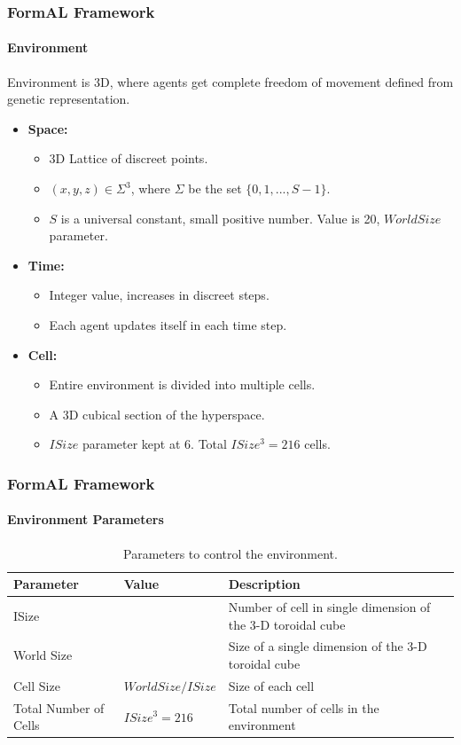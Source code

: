 \frame
{
	\frametitle{FormAL Framework}
	\framesubtitle{Environment}
	
	Environment is 3D, where agents get complete freedom of movement defined from genetic representation.
	\begin{itemize}
		\item \textbf{Space:}
			\begin{itemize}
				\item 3D Lattice of discreet points.
				\item \((x,y,z) \in \Sigma^3\), where \(\Sigma\) be the set \(\{0, 1, ..., S-1\}\).
				\item \(S\) is a universal constant, small positive number. Value is 20, \(World Size\) parameter. 
			\end{itemize}
		\item \textbf{Time:}
			\begin{itemize}
				\item Integer value, increases in discreet steps. 
				\item Each agent updates itself in each time step.
			\end{itemize}
		\item \textbf{Cell:}
			\begin{itemize}
				\item Entire environment is divided into multiple cells.
				\item A 3D cubical section of the hyperspace.
				\item \(ISize\) parameter kept at 6. Total \(ISize^3 = 216\) cells.
			\end{itemize}
	\end{itemize}
}

\frame
{
	\frametitle{FormAL Framework}
	\framesubtitle{Environment Parameters}
	
	\begin{table}[H]
	\centering
	\begin{spacing}{1.5}
	\begin{scriptsize}
	\begin{tabular}{| p{1.5cm} | >{\centering} p{2cm} | p{4cm} |}
		\hline
			\textbf{Parameter} & \textbf{Value} & \textbf{Description} \\ \hline
			ISize & 6 & Number of cell in single dimension of the 3-D toroidal cube\\ \hline
			World Size & 20 & Size of a single dimension of the 3-D toroidal cube\\ \hline
			Cell Size & \( World Size / ISize \) & Size of each cell\\ \hline
			Total Number of Cells & \( ISize^3  = 216\) & Total number of cells in the environment\\ 
		\hline
	\end{tabular}
	\end{scriptsize}
	\end{spacing}
	\caption{Parameters to control the environment.}
	\label{tab:environment-control-parameters}
	\end{table}
}

